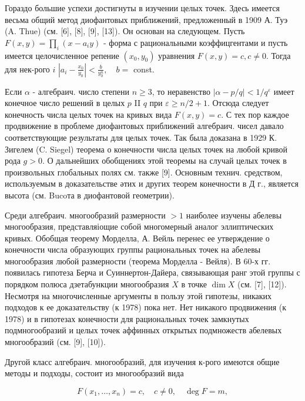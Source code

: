 \documentclass[10pt]{article}
\begin{document}
Гораздо большие успехи достигнуты в изучении целых точек. Здесь имеется весьма общий метод диофантовых приближений, предложенный в 1909 А. Туэ (A. Thue) (см. [6], [8], [9], [13]). Он основан на следующем. Пусть $F(x, y)=\prod_{i}\left(x-a_{i} y\right)$ - форма с рациональными коэффицгентами и пусть имеется целочисленное репение $\left(x_{0}, y_{0}\right)$ уравнения $F(x, y)=c, c \neq 0$. Тогда для нек-рого $i$ $\left|a_{i}-\frac{x_{0}}{y_{0}}\right|<\frac{b}{y_{0}^{n}}, \quad b=$ const.



Если $\alpha$ - алгебраич. число степени $n \geqslant 3$, то неравенство $|\alpha-p / q|<1 / q^{\varepsilon}$ имеет конечное число решений в целых $p$ II $q$ при $\varepsilon \geqslant n / 2+1$. Отсюда следует конечность числа целых точек на кривых вида $F(x, y)=c$. С тех пор каждое продвижение в проблеме диофантовых приближений алгебраич. чисел давало соответствующие результаты для целых точек. Так была доказана в 1929 К. Зигелем (C. Siegel) теорема о конечности числа целых точек на любой кривой рода $g>0$. О дальнейших обобщениях этой теоремы на случай целых точек в произвольных глобальных полях см. также [9]. Основным технич. средством, используемым в доказательстве әтих и других теорем конечности в Д г., является высота (см. Bucoта в диофантовой геометрии).



Среди алгебраич. многообразий размерности $>1$ наиболее изучены абелевы многообразия, представляіощие собой многомерный аналог эллиптических кривых. Обобщая теорему Морделла, А. Вейль перенес ее утверждение о конечности числа образующих группы рациональных точек на абелевы многообразия любой размерности (теорема Морделла - Вейля). В 60-х гг. появилась гипотеза Берча и Суиннертон-Дайера, связывающая ранг этой группы с порядком полюса дзетабункции многообразия $X$ в точке $\operatorname{dim} X$ (см. [7], [12]). Несмотря на многочисленные аргументы в пользу этой гипотезы, никаких подходов к ее доказательству (к 1978) пока нет. Нет никакого продвижения (к 1978) и в гипотезах конечности для рациональных точек замкнутых подмногообразий и целых точек аффинных открытых подмножеств абелевых многообразий (см. [9], [10]).



Другой класс алгебраич. многообразий, для изучения к-рого имеются общие методы и подходы, состоит из многообразий вида



\[

F\left(x_{1}, \ldots, x_{n}\right)=c, \quad c \neq 0, \quad \operatorname{deg} F=m,

\]
\end{document}
